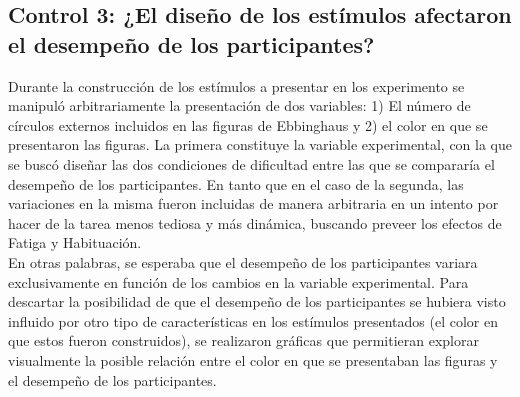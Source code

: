 \subsection{Control 3: ¿El diseño de los estímulos afectaron el desempeño de los participantes?}

Durante la construcción de los estímulos a presentar en los experimento se manipuló arbitrariamente la presentación de dos variables: 1) El número de círculos externos incluidos en las figuras de Ebbinghaus y 2) el color en que se presentaron las figuras. La primera constituye la variable experimental, con la que se buscó diseñar las dos condiciones de dificultad entre las que se compararía el desempeño de los participantes. En tanto que en el caso de la segunda, las variaciones en la misma fueron incluidas de manera arbitraria en un intento por hacer de la tarea menos tediosa y más dinámica, buscando preveer los efectos de Fatiga y Habituación.\\

En otras palabras, se esperaba que el desempeño de los participantes variara exclusivamente en función de los cambios en la variable experimental. Para descartar la posibilidad de que el desempeño de los participantes se hubiera visto influido por otro tipo de características en los estímulos presentados (el color en que estos fueron construidos), se realizaron gráficas que permitieran explorar visualmente la posible relación entre el color en que se presentaban las figuras y el desempeño de los participantes.\\

